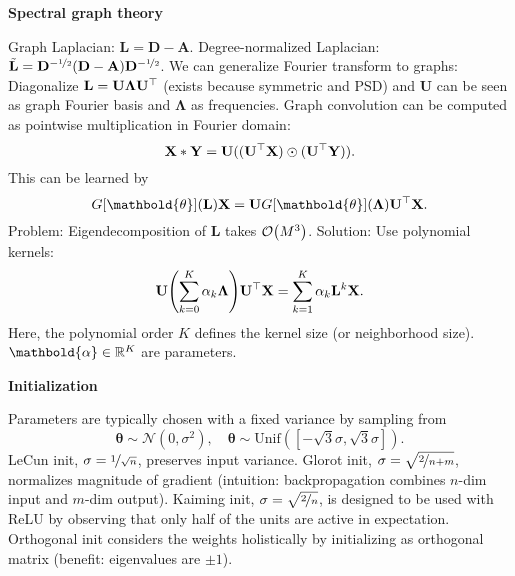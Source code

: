 \documentclass[10pt]{article}
\newenvironment{topic}[1]
{\textbf{\sffamily \footnotesize \colorbox{black}{\rlap{\textbf{\textcolor{white}{#1}}}\hspace{\linewidth}\hspace{-2\fboxsep}}}}
{}
\newenvironment{subtopic}[1]
{\vspace{0.1cm} \begin{center}\textbf{\footnotesize \sffamily #1}\end{center}}
{}
\renewcommand{\mat}[1]{\ensuremath{\mathbf{#1}}}
\renewcommand{\vec}[1]{\ensuremath{\mathbold{#1}}}
\begin{document}
\begin{multicols*}{3}
\begin{topic}{Geometric deep learning}
\begin{subtopic}{Spectral graph theory}
            Graph Laplacian: $\mat{L} = \mat{D} - \mat{A}$. Degree-normalized Laplacian: $\tilde{\mat{L}} =
                \mat{D}^{-\nicefrac{1}{2}} (\mat{D} - \mat{A}) \mat{D}^{-\nicefrac{1}{2}}$. We can generalize
            Fourier transform to graphs: Diagonalize $\mat{L} = \mat{U} \mat{\Lambda} \transpose{\mat{U}}$
            (exists because symmetric and PSD) and $\mat{U}$ can be seen as graph Fourier basis and
            $\mat{\Lambda}$ as frequencies. Graph convolution can be computed as pointwise multiplication in
            Fourier domain: \[
                \mat{X} * \mat{Y} = \mat{U}((\transpose{\mat{U}}\mat{X}) \odot (\transpose{\mat{U}} \mat{Y})).
            \]
            This can be learned by \[
                G[\vec{\theta}](\mat{L}) \mat{X} = \mat{U} G[\vec{\theta}](\mat{\Lambda}) \transpose{\mat{U}} \mat{X}.
            \]
            Problem: Eigendecomposition of $\mat{L}$ takes $\bigo{M^3}$. Solution: Use polynomial kernels: \[
                \mat{U} \lft( \sum_{k=0}^{K} \alpha_k \mat{\Lambda} \rgt) \transpose{\mat{U}} \mat{X} = \sum_{k=1}^{K} \alpha_k \mat{L}^k \mat{X}.
            \]
            Here, the polynomial order $K$ defines the kernel size (or neighborhood size). $\vec{\alpha} \in
                \R^K$ are parameters.
        \end{subtopic}

    \end{topic}

    \vfill\null
    \columnbreak

    \begin{topic}{Tricks of the trade}

        \begin{subtopic}{Initialization}
            Parameters are typically chosen with a fixed variance by sampling from \[
                \vec{\theta} \sim \mathcal{N}(0, \sigma^2), \quad \vec{\theta} \sim \mathrm{Unif}([-\sqrt{3}\sigma,\sqrt{3}\sigma]).
            \]
            LeCun init, $\sigma = \nicefrac{1}{\sqrt{n}}$, preserves input variance. Glorot init, $\sigma =
                \sqrt{\nicefrac{2}{n+m}}$, normalizes magnitude of gradient (intuition: backpropagation combines
            $n$-dim input and $m$-dim output). Kaiming init, $\sigma = \sqrt{\nicefrac{2}{n}}$, is designed to
            be used with ReLU by observing that only half of the units are active in expectation. Orthogonal
            init considers the weights holistically by initializing as orthogonal matrix (benefit: eigenvalues
            are $\pm 1$).
        \end{subtopic}


\end{topic}
\end{multicols*}
\end{document}
